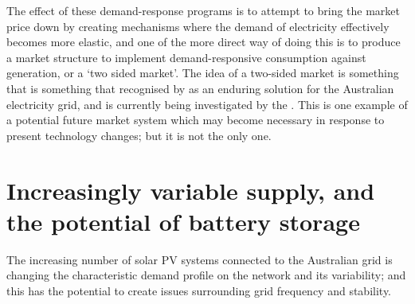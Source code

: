 The effect of these demand-response programs is to attempt to bring the market price down by creating mechanisms where the demand of electricity effectively becomes more elastic, and one of the more direct way of doing this is to produce a market structure to implement demand-responsive consumption against generation, or a `two sided market'.
The idea of a two-sided market is something that is something that recognised by \cite{australianenergymarketcommission2020} as an enduring solution for the Australian electricity grid, and is currently being investigated by the \cite{energysecurityboard2020}.
This is one example of a potential future market system which may become necessary in response to present technology changes; but it is not the only one.

\DIFaddbegin {}

\noindent {}

\DIFaddend \section{Increasingly variable supply, and the potential of battery storage}

The increasing number of solar PV systems connected to the Australian grid is changing the characteristic demand profile on the network and its variability; and this has the potential to create issues surrounding grid frequency and stability.

